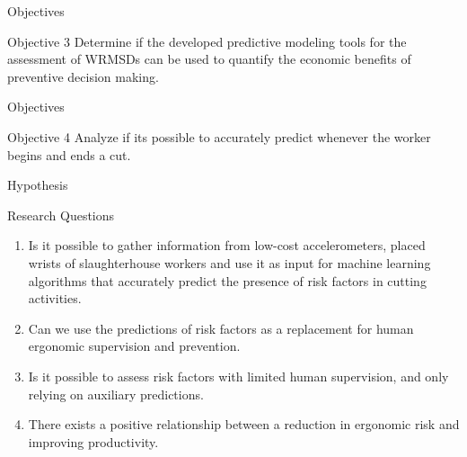 \begin{frame}{Objectives}
    \begin{alertblock}{Objective 3}
    Determine if the developed predictive modeling tools for the assessment of WRMSDs can be used to quantify the economic benefits of preventive decision making.
    \end{alertblock}
\end{frame}

\begin{frame}{Objectives}
    \begin{alertblock}{Objective 4}
    Analyze if its possible to accurately predict whenever the worker begins and ends a cut.
    \end{alertblock}
\end{frame}



\begin{frame}{Hypothesis}
    \begin{alertblock}{Research Questions}
    \begin{enumerate}%
    \item Is it possible to gather information from low-cost accelerometers, placed wrists of slaughterhouse workers and use it as input for machine learning algorithms that accurately predict the presence of risk factors in cutting activities.
    \item Can we use the predictions of risk factors as a replacement for human ergonomic supervision and prevention.
    \item Is it possible to assess risk factors with limited human supervision, and only relying on auxiliary predictions.
    \item There exists a positive relationship between a reduction in ergonomic risk and improving productivity.
    \end{enumerate}
    \end{alertblock}
\end{frame}






























